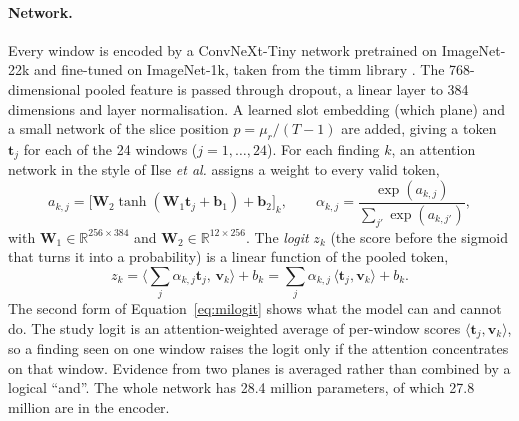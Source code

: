\paragraph{Network.} Every window is encoded by a ConvNeXt-Tiny network \cite{liu2022convnext} pretrained on ImageNet-22k and fine-tuned on ImageNet-1k, taken from the timm library \cite{wightman2019timm}. The 768-dimensional pooled feature is passed through dropout, a linear layer to 384 dimensions and layer normalisation. A learned slot embedding (which plane) and a small network of the slice position $p=\mu_r/(T-1)$ are added, giving a token $\mathbf t_j$ for each of the 24 windows ($j=1,\dots,24$). For each finding $k$, an attention network in the style of Ilse \emph{et al.} \cite{ilse2018} assigns a weight to every valid token,
\begin{equation}
a_{k,j} = \big[\mathbf W_2 \tanh(\mathbf W_1 \mathbf t_j + \mathbf b_1) + \mathbf b_2\big]_k, \qquad
\alpha_{k,j} = \frac{\exp(a_{k,j})}{\sum_{j'} \exp(a_{k,j'})},
\label{eq:attn}
\end{equation}
with $\mathbf W_1\in\mathbb R^{256\times384}$ and $\mathbf W_2\in\mathbb R^{12\times256}$. The \emph{logit} $z_k$ (the score before the sigmoid that turns it into a probability) is a linear function of the pooled token,
\begin{equation}
z_k = \Big\langle \sum_j \alpha_{k,j}\mathbf t_j ,\, \mathbf v_k\Big\rangle + b_k = \sum_j \alpha_{k,j}\,\langle \mathbf t_j,\mathbf v_k\rangle + b_k .
\label{eq:milogit}
\end{equation}
The second form of Equation~\eqref{eq:milogit} shows what the model can and cannot do. The study logit is an attention-weighted average of per-window scores $\langle\mathbf t_j,\mathbf v_k\rangle$, so a finding seen on one window raises the logit only if the attention concentrates on that window. Evidence from two planes is averaged rather than combined by a logical ``and''. The whole network has 28.4 million parameters, of which 27.8 million are in the encoder.

